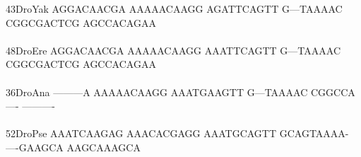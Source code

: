 \documentclass[11pt,twoside,reqno,a4paper]{article}
\begin{document}
{43\hspace*{2\charwidth}DroYak	AGGACAACGA	AAAAACAAGG	AGATTCAGTT	G---TAAAAC	CGGCGACTCG	AGCCACAGAA	\\
\hspace*{4\charwidth}\hspace*{7\charwidth}\hspace*{1\charwidth}\hspace*{1\charwidth}\hspace*{1\charwidth}\hspace*{1\charwidth}\hspace*{1\charwidth}\hspace*{1\charwidth}\\
48\hspace*{2\charwidth}DroEre	AGGACAACGA	AAAAACAAGG	AAATTCAGTT	G---TAAAAC	CGGCGACTCG	AGCCACAGAA	\\
\hspace*{4\charwidth}\hspace*{7\charwidth}\hspace*{1\charwidth}\hspace*{1\charwidth}\hspace*{1\charwidth}\hspace*{1\charwidth}\hspace*{1\charwidth}\hspace*{1\charwidth}\\
36\hspace*{2\charwidth}DroAna	---------A	AAAAACAAGG	AAATGAAGTT	G---TAAAAC	CGGCCA----	----------	\\
\hspace*{4\charwidth}\hspace*{7\charwidth}\hspace*{1\charwidth}\hspace*{1\charwidth}\hspace*{1\charwidth}\hspace*{1\charwidth}\hspace*{1\charwidth}\hspace*{1\charwidth}\\
52\hspace*{2\charwidth}DroPse	AAATCAAGAG	AAACACGAGG	AAATGCAGTT	GCAGTAAAA-	----GAAGCA	AAGCAAAGCA	\\
\hspace*{4\charwidth}\hspace*{7\charwidth}\hspace*{1\charwidth}\hspace*{1\charwidth}\hspace*{1\charwidth}\hspace*{1\charwidth}\hspace*{1\charwidth}\hspace*{1\charwidth}\\
}
\end{document}
